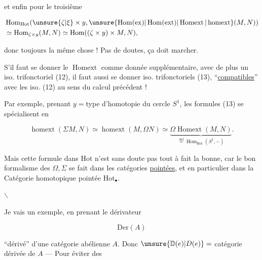 et enfin pour le troisième

\[
\begin{aligned}
&\operatorname{Hom}_{\mathrm{Hot}}(\unsure{\zeta|\xi}\times y,\unsure{\operatorname{Hom}(\mathrm{ex})|\operatorname{Hom}(\mathrm{ext})|\operatorname{Homext}|\operatorname{homext}}(M,N))\\
&\simeq\operatorname{Hom}_{\zeta\times y}(M,N)\simeq\operatorname{Hom}((\zeta\times y)\times M,N),
\end{aligned}
\]

donc toujours la même chose !  Pas de doutes, ça doit marcher.

S'il faut se donner le $\operatorname{Homext}$  comme donnée supplémentaire, avec de plus un iso. trifonctoriel (12), il faut aussi se donner  iso. trifonctoriels (13), ``\uline{compatibles}'' avec les iso. (12) au sens du calcul précédent ! 

Par exemple, prenant $y={}$type d'homotopie du cercle $S^1$, les formules (13) se spécialisent en

\[
\operatorname{homext}(\Sigma M,N)\simeq
\operatorname{homext}(M,\Omega N)\simeq
\underbrace{\Omega\operatorname{Homext}(M,N)}_{\overset{\mathrm{def}}{=}\operatorname{Hom}_{\mathrm{Hot}}(S^1,-)}.
\tag*{(14)}
\]

Mais cette formule dans $\mathrm{Hot}$ n'est sans doute pas tout à fait la bonne, car le bon formalisme des $\Omega,\Sigma$ se fait dans les catégories \uline{pointées}, et en particulier dans la Catégorie homotopique pointée $\mathrm{Hot}_{\bullet}$.

\hfil$\backslash$\hfil

Je vais  un exemple, en prenant le dérivateur

\[
\mathrm{Der}(A)
\]

 ``dérivé'' d'une catégorie abélienne $A$. Donc $\unsure{\mathbb D(e)|D(e)}={}$catégorie dérivée de $A$ --- Pour éviter des
